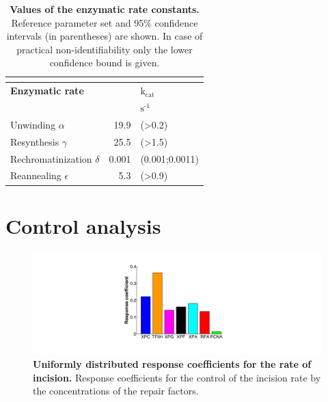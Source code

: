 \begin{table}[H]
	
\begin{center}
	\begin{tabular}{lrl}
		
		\multicolumn{3}{l}{} \\
		\hline
		\textbf{Enzymatic rate}    && \textbf{$\text{k}_{\text{cat}}$}  \\
		\hline
		&  &$\text{s}^{\text{-1}}$       \\
		Unwinding  $\alpha$                                     & 19.9& (>0.2)                 \\
		Resynthesis $\gamma$                                 & 25.5 &(>1.5)     \\
		Rechromatinization $\delta$                         & 0.001 &(0.001;0.0011)                   \\
		Reannealing  $\epsilon$                                & 5.3&(>0.9)    \\
		\hline
	\end{tabular}
	\caption{\textbf{Values of the enzymatic rate constants.}  Reference parameter set and 95\% confidence intervals (in parentheses) are shown. In case of practical non-identifiability only the lower confidence bound is given.}
	\label{tab:parameter_catalyticRates}
	\end{center}
\end{table}
\section{Control analysis}

\begin{figure}[h!]
	\begin{center}
		\includegraphics[width=1\textwidth]{Abbildungen/figure_A_4.pdf}
		\caption{\textbf{Uniformly distributed response coefficients for the rate of incision.} Response coefficients for the control of the incision rate by the concentrations of the repair factors. }
		\label{fig:cc_rateOfincision}
	\end{center}
\end{figure}

